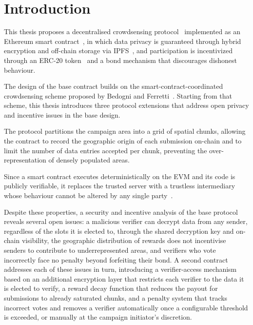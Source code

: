 \chapter{Introduction} \label{ch:intro}
\pagestyle{plain}
\setcounter{page}{1}
This thesis proposes a decentralised crowdsensing protocol~\cite{ganti2011mobile, capponi2019survey} implemented as
an Ethereum smart contract~\cite{chen2021survey, yu2023blockchain}, in which data privacy is guaranteed through
hybrid encryption and off-chain storage via IPFS~\cite{benet2014ipfs}, and participation is
incentivized through an ERC-20 token~\cite{eip20} and a bond mechanism that discourages
dishonest behaviour.

The design of the base contract builds on the smart-contract-coordinated crowdsensing scheme proposed by Bedogni and Ferretti~\cite{bedogni2024crowdsensing}.
Starting from that scheme, this thesis introduces three protocol extensions that address open privacy and incentive issues in the base design.

The protocol partitions the campaign area into a grid of spatial chunks,
allowing the contract to record the geographic origin of each submission on-chain and to limit the number of data entries accepted per chunk,
preventing the over-representation of densely populated areas.

Since a smart contract executes deterministically on the EVM and its code is
publicly verifiable, it replaces the trusted server with a trustless
intermediary whose behaviour cannot be altered by any single party~\cite{bedogni2024crowdsensing, gigli2024decentralization}.

Despite these properties, a security and incentive analysis of the base
protocol reveals several open issues:
a malicious verifier can decrypt data from any sender, regardless of the slots it is elected to, through the shared decryption key and on-chain visibility,
the geographic distribution of rewards does not incentivise senders to contribute to underrepresented
areas, and verifiers who vote incorrectly face no penalty beyond forfeiting their bond.
A second contract addresses each of these issues in turn, introducing a verifier-access mechanism
based on an additional encryption layer that restricts each verifier to the data it is elected to verify,
a reward decay function that reduces the payout for submissions to already
saturated chunks, and a penalty system that tracks incorrect votes and removes a verifier automatically once a configurable threshold is exceeded, or manually at the campaign initiator's discretion.

